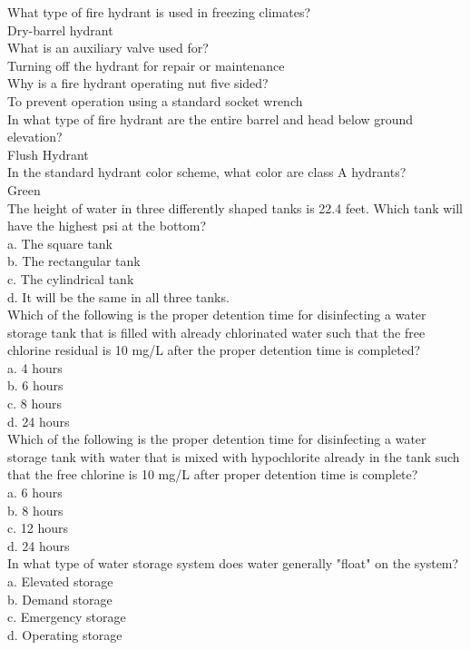 What type of fire hydrant is used in freezing climates?\\
Dry-barrel hydrant\\
What is an auxiliary valve used for?\\
Turning off the hydrant for repair or maintenance\\
Why is a fire hydrant operating nut five sided?\\
To prevent operation using a standard socket wrench\\
In what type of fire hydrant are the entire barrel and head below ground elevation?\\
Flush Hydrant\\
In the standard hydrant color scheme, what color are class A hydrants?\\
Green\\
The height of water in three differently shaped tanks is 22.4 feet. Which tank will have the highest psi at the bottom?\\
a.	The square tank\\
b.	The rectangular tank\\
c.	The cylindrical tank\\
d.	It will be the same in all three tanks.\\
Which of the following is the proper detention time for disinfecting a water storage tank that is filled with already chlorinated water such that the free chlorine residual is 10 mg/L after the proper detention time is completed?\\
a.	4 hours\\
b.	6 hours\\
c.	8 hours\\
d.	24 hours\\
Which of the following is the proper detention time for disinfecting a water storage tank with water that is mixed with hypochlorite already in the tank such that the free chlorine is 10 mg/L after proper detention time is complete?\\
a.	6 hours\\
b.	8 hours\\
c.	12 hours\\
d.	24 hours\\
In what type of water storage system does water generally "float" on the system?\\
a.	Elevated storage\\
b.	Demand storage\\
c.	Emergency storage\\
d.	Operating storage\\
